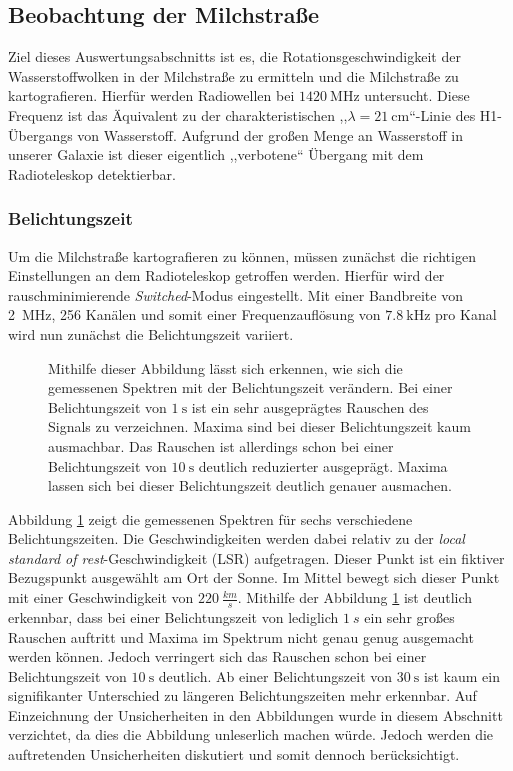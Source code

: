 \subsection{Beobachtung der Milchstraße}
Ziel dieses Auswertungsabschnitts ist es, die Rotationsgeschwindigkeit der Wasserstoffwolken in der Milchstraße zu ermitteln und die Milchstraße zu kartografieren.\newline
Hierfür werden Radiowellen bei $\SI{1420}{\mega \hertz}$ untersucht. Diese Frequenz ist das Äquivalent zu der charakteristischen ,,$\lambda = \SI{21}{\centi \metre}$``-Linie des H1-Übergangs von Wasserstoff. Aufgrund der großen Menge an Wasserstoff in unserer Galaxie ist dieser eigentlich ,,verbotene`` Übergang mit dem Radioteleskop detektierbar.\newline
\subsubsection{Belichtungszeit}
Um die Milchstraße kartografieren zu können, müssen zunächst die richtigen Einstellungen an dem Radioteleskop getroffen werden. Hierfür wird der rauschminimierende \textit{Switched}-Modus eingestellt. Mit einer Bandbreite von \SI{2}{MHz}, 256 Kanälen und somit einer Frequenzauflösung von $\SI{7.8}{\kilo \hertz}$ pro Kanal \cite{Usermanual} wird nun zunächst die Belichtungszeit variiert. 
\begin{figure}[H]
    \centering
    \resizebox{0.8\textwidth}{!}{} 
    \caption[Gemessene Spektren bei verschiedenen Belichtungszeiten]{Mithilfe dieser Abbildung lässt sich erkennen, wie sich die gemessenen Spektren mit der Belichtungszeit verändern. Bei einer Belichtungszeit von $\SI{1}{\second}$ ist ein sehr ausgeprägtes Rauschen des Signals zu verzeichnen. Maxima sind bei dieser Belichtungszeit kaum ausmachbar. Das Rauschen ist allerdings schon bei einer Belichtungszeit von $\SI{10}{\second}$ deutlich reduzierter ausgeprägt. Maxima lassen sich bei dieser Belichtungszeit deutlich genauer ausmachen.}
    \label{fig:Belichtungszeit}
\end{figure}
Abbildung \ref{fig:Belichtungszeit} zeigt die gemessenen Spektren für sechs verschiedene Belichtungszeiten. Die Geschwindigkeiten werden dabei relativ zu der \textit{local standard of rest}-Geschwindigkeit (LSR) aufgetragen. Dieser Punkt ist ein fiktiver Bezugspunkt ausgewählt am Ort der Sonne. Im Mittel bewegt sich dieser Punkt mit einer Geschwindigkeit von $\SI{220}{\frac{km}{s}}$.
Mithilfe der Abbildung \ref{fig:Belichtungszeit} ist deutlich erkennbar, dass bei einer Belichtungszeit von lediglich $\SI{1}{s}$ ein sehr großes Rauschen auftritt und Maxima im Spektrum nicht genau genug ausgemacht werden können. Jedoch verringert sich das Rauschen schon bei einer Belichtungszeit von $\SI{10}{\second}$ deutlich. Ab einer Belichtungszeit von $\SI{30}{\second}$ ist kaum ein signifikanter Unterschied zu längeren Belichtungszeiten mehr erkennbar. Auf Einzeichnung der Unsicherheiten in den Abbildungen wurde in diesem Abschnitt verzichtet, da dies die Abbildung unleserlich machen würde. Jedoch werden die auftretenden Unsicherheiten diskutiert und somit dennoch berücksichtigt.

